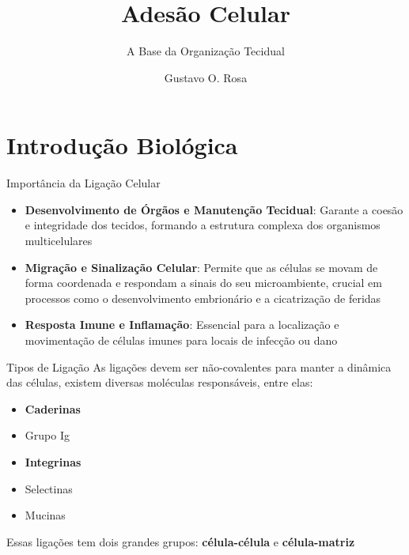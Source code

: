 \documentclass[aspectratio=169]{beamer}
\title{Adesão Celular}
\subtitle{A Base da Organização Tecidual}
\author{Gustavo O. Rosa}
\institute{Laboratório de Inovação em Física Aplicada}
\begin{document}
\begin{frame}[plain]
    \titlepage
\end{frame}




\section{Introdução Biológica}

\begin{frame}{Importância da Ligação Celular}
    \begin{itemize}
        \item \textbf{Desenvolvimento de Órgãos e Manutenção Tecidual}: 
        Garante a coesão e integridade dos tecidos, formando a estrutura complexa dos organismos 
        multicelulares
        \item \textbf{Migração e Sinalização Celular}: Permite que as células se movam de forma
        coordenada e respondam a sinais do seu microambiente, crucial em processos como o 
        desenvolvimento embrionário e a cicatrização de feridas
        \item \textbf{Resposta Imune e Inflamação}: Essencial para a localização e movimentação de 
        células imunes para locais de infecção ou dano
    \end{itemize}
\end{frame}

\begin{frame}{Tipos de Ligação}
    As ligações devem ser não-covalentes para manter a dinâmica das células, existem diversas moléculas responsáveis, entre elas:
    \begin{itemize}
        \item \textbf{Caderinas}
        \item Grupo Ig
        \item \textbf{Integrinas}
        \item Selectinas 
        \item Mucinas
    \end{itemize}
    Essas ligações tem dois grandes grupos: \textbf{célula-célula} e \textbf{célula-matriz}
\end{frame}
\end{document}
